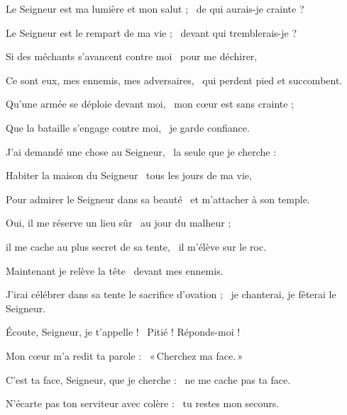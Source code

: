 \item Le Seigneur est ma lumière et mon salut ;~\psstar{} de qui aurais-je crainte ?

\item Le Seigneur est le rempart de ma vie ;~\psstar{} devant qui tremblerais-je ?

\item Si des méchants s'avancent contre moi~\psstar{} pour me déchirer,

\item Ce sont eux, mes ennemis, mes adversaires,~\psstar{} qui perdent pied et succombent.

\item Qu'une armée se déploie devant moi,~\psstar{} mon cœur est sans crainte ;

\item Que la bataille s'engage contre moi,~\psstar{} je garde confiance.

\item J'ai demandé une chose au Seigneur,~\psstar{} la seule que je cherche :

\item Habiter la maison du Seigneur~\psstar{} tous les jours de ma vie,

\item Pour admirer le Seigneur dans sa beauté~\psstar{} et m'attacher à son temple.

\item Oui, il me réserve un lieu sûr~\psstar{} au jour du malheur ;

\item il me cache au plus secret de sa tente,~\psstar{} il m'élève sur le roc.

\item Maintenant je relève la tête~\psstar{} devant mes ennemis.

\item J'irai célébrer dans sa tente le sacrifice d'ovation ;~\psstar{} je chanterai, je fêterai le Seigneur.

\item Écoute, Seigneur, je t'appelle !~\psstar{} Pitié ! Réponds-moi !

\item Mon cœur m'a redit ta parole :~\psstar{} «\,Cherchez ma face.\,»

\item C'est ta face, Seigneur, que je cherche :~\psstar{} ne me cache pas ta face.

\item N'écarte pas ton serviteur avec colère :~\psstar{} tu restes mon secours.

